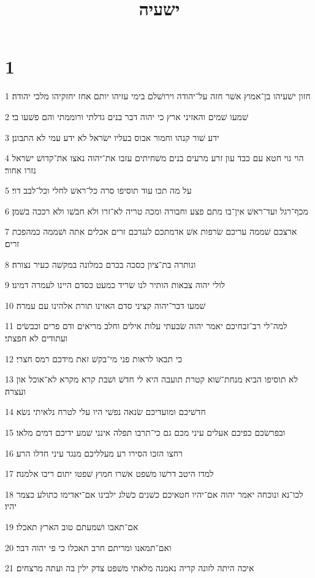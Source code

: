 

\title{ישעיה}


\chapter{1}

\par 1 חזון ישׁעיהו בן־אמוץ אשׁר חזה על־יהודה וירושׁלם בימי עזיהו יותם אחז יחזקיהו מלכי יהודה׃
\par 2 שׁמעו שׁמים והאזיני ארץ כי יהוה דבר בנים גדלתי ורוממתי והם פשׁעו בי׃
\par 3 ידע שׁור קנהו וחמור אבוס בעליו ישׂראל לא ידע עמי לא התבונן׃
\par 4 הוי גוי חטא עם כבד עון זרע מרעים בנים משׁחיתים עזבו את־יהוה נאצו את־קדושׁ ישׂראל נזרו אחור׃
\par 5 על מה תכו עוד תוסיפו סרה כל־ראשׁ לחלי וכל־לבב דוי׃
\par 6 מכף־רגל ועד־ראשׁ אין־בו מתם פצע וחבורה ומכה טריה לא־זרו ולא חבשׁו ולא רככה בשׁמן׃
\par 7 ארצכם שׁממה עריכם שׂרפות אשׁ אדמתכם לנגדכם זרים אכלים אתה ושׁממה כמהפכת זרים׃
\par 8 ונותרה בת־ציון כסכה בכרם כמלונה במקשׁה כעיר נצורה׃
\par 9 לולי יהוה צבאות הותיר לנו שׂריד כמעט כסדם היינו לעמרה דמינו׃
\par 10 שׁמעו דבר־יהוה קציני סדם האזינו תורת אלהינו עם עמרה׃
\par 11 למה־לי רב־זבחיכם יאמר יהוה שׂבעתי עלות אילים וחלב מריאים ודם פרים וכבשׂים ועתודים לא חפצתי׃
\par 12 כי תבאו לראות פני מי־בקשׁ זאת מידכם רמס חצרי׃
\par 13 לא תוסיפו הביא מנחת־שׁוא קטרת תועבה היא לי חדשׁ ושׁבת קרא מקרא לא־אוכל און ועצרה׃
\par 14 חדשׁיכם ומועדיכם שׂנאה נפשׁי היו עלי לטרח נלאיתי נשׂא׃
\par 15 ובפרשׂכם כפיכם אעלים עיני מכם גם כי־תרבו תפלה אינני שׁמע ידיכם דמים מלאו׃
\par 16 רחצו הזכו הסירו רע מעלליכם מנגד עיני חדלו הרע׃
\par 17 למדו היטב דרשׁו משׁפט אשׁרו חמוץ שׁפטו יתום ריבו אלמנה׃
\par 18 לכו־נא ונוכחה יאמר יהוה אם־יהיו חטאיכם כשׁנים כשׁלג ילבינו אם־יאדימו כתולע כצמר יהיו׃
\par 19 אם־תאבו ושׁמעתם טוב הארץ תאכלו׃
\par 20 ואם־תמאנו ומריתם חרב תאכלו כי פי יהוה דבר׃
\par 21 איכה היתה לזונה קריה נאמנה מלאתי משׁפט צדק ילין בה ועתה מרצחים׃
